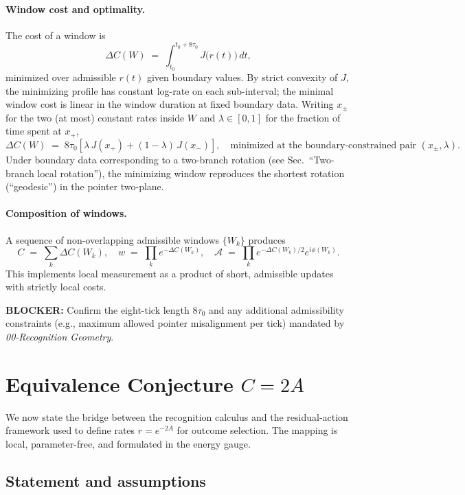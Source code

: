 \documentclass[11pt,letterpaper]{article}
\begin{document}
\paragraph{Window cost and optimality.}
The cost of a window is
\begin{equation}
\Delta C(W)\;=\;\int_{t_0}^{t_0+8\tau_0}\!\!\!J\!\bigl(r(t)\bigr)\,dt,
\end{equation}
minimized over admissible \(r(t)\) given boundary values. By strict convexity of \(J\), the minimizing profile has constant log-rate on each sub-interval; the minimal window cost is linear in the window duration at fixed boundary data. Writing \(x_\pm\) for the two (at most) constant rates inside \(W\) and \(\lambda\in[0,1]\) for the fraction of time spent at \(x_+\),
\begin{equation}
\Delta C(W)\;=\;8\tau_0\left[\lambda\,J(x_+)+(1-\lambda)\,J(x_-)\right],
\quad
\text{minimized at the boundary-constrained pair } (x_\pm,\lambda).
\end{equation}
Under boundary data corresponding to a two-branch rotation (see Sec.~``Two-branch local rotation''), the minimizing window reproduces the shortest rotation (``geodesic'') in the pointer two-plane.

\paragraph{Composition of windows.}
A sequence of non-overlapping admissible windows \(\{W_k\}\) produces
\[
C\;=\;\sum_k \Delta C(W_k),\quad
w\;=\;\prod_k e^{-\Delta C(W_k)},\quad
\mathcal A\;=\;\prod_k e^{-\Delta C(W_k)/2}e^{i\phi(W_k)}.
\]
This implements local measurement as a product of short, admissible updates with strictly local costs.

\noindent\textbf{BLOCKER:} Confirm the eight-tick length \(8\tau_0\) and any additional admissibility constraints (e.g., maximum allowed pointer misalignment per tick) mandated by \emph{00-Recognition Geometry}. 

\section{Equivalence Conjecture \(C=2A\)}

We now state the bridge between the recognition calculus and the residual-action framework used to define rates \(r=e^{-2A}\) for outcome selection. The mapping is local, parameter-free, and formulated in the energy gauge.

\subsection{Statement and assumptions}
\end{document}
